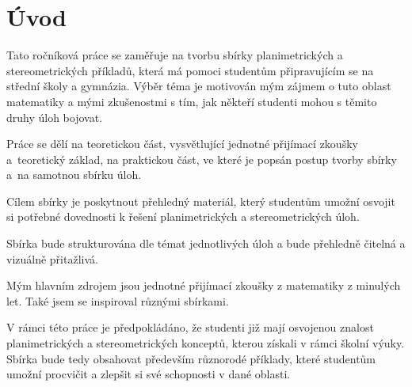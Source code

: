 \chapter*{Úvod}

Tato ročníková práce se zaměřuje na tvorbu sbírky planimetrických a stereometrických příkladů, která má pomoci studentům připravujícím se na střední školy a gymnázia. Výběr téma je motivován mým zájmem o tuto oblast matematiky a mými zkušenostmi s tím, jak někteří studenti mohou s těmito druhy úloh bojovat.

Práce se dělí na teoretickou část, vysvětlující jednotné přijímací zkoušky a~teoretický základ, na praktickou část, ve které je popsán postup tvorby sbírky a~na samotnou sbírku úloh.

Cílem sbírky je poskytnout přehledný materiál, který studentům umožní osvojit si potřebné dovednosti k řešení planimetrických a stereometrických úloh.

Sbírka bude strukturována dle témat jednotlivých úloh a bude přehledně čitelná a vizuálně přitažlivá.

Mým hlavním zdrojem jsou jednotné přijímací zkoušky z matematiky z minulých let. Také jsem se inspiroval různými sbírkami.

V rámci této práce je předpokládáno, že studenti již mají osvojenou znalost planimetrických a stereometrických konceptů, kterou získali v rámci školní výuky. Sbírka bude tedy obsahovat především různorodé příklady, které studentům umožní procvičit a zlepšit si své schopnosti v dané oblasti.

